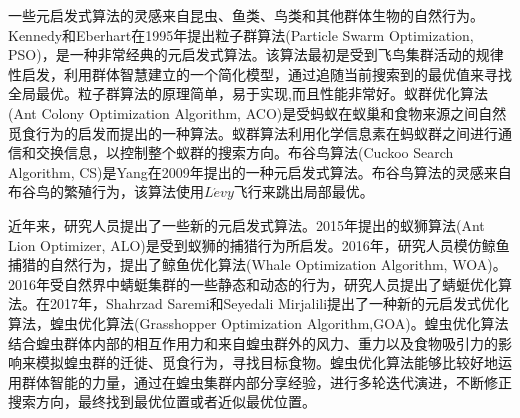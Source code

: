 一些元启发式算法的灵感来自昆虫、鱼类、鸟类和其他群体生物的自然行为。Kennedy和Eberhart在1995年提出粒子群算法(Particle Swarm Optimization, PSO)，是一种非常经典的元启发式算法\cite{kennedy1995particle,liao2007discrete,krishnasamy2013task}。该算法最初是受到飞鸟集群活动的规律性启发，利用群体智慧建立的一个简化模型，通过追随当前搜索到的最优值来寻找全局最优。粒子群算法的原理简单，易于实现,而且性能非常好。蚁群优化算法(Ant Colony Optimization Algorithm, ACO)是受蚂蚁在蚁巢和食物来源之间自然觅食行为的启发而提出的一种算法\cite{dorigo1997ant,dorigo1999ant,郝航2018基于并行化蚁群算法的网络测量节点选取算法}。蚁群算法利用化学信息素在蚂蚁群之间进行通信和交换信息，以控制整个蚁群的搜索方向。布谷鸟算法(Cuckoo Search Algorithm, CS)是Yang在2009年提出的一种元启发式算法\cite{yang2009cuckoo}。布谷鸟算法的灵感来自布谷鸟的繁殖行为，该算法使用$L\acute{e}vy$飞行来跳出局部最优。

近年来，研究人员提出了一些新的元启发式算法。2015年提出的蚁狮算法(Ant Lion Optimizer, ALO)是受到蚁狮的捕猎行为所启发\cite{mirjalili2015ant}。2016年，研究人员模仿鲸鱼捕猎的自然行为，提出了鲸鱼优化算法(Whale Optimization Algorithm, WOA)\cite{mirjalili2016whale,hu2016whale}。2016年受自然界中蜻蜓集群的一些静态和动态的行为，研究人员提出了蜻蜓优化算法\cite{mirjalili2016dragonfly,abdel2017solving,ks2017memory,song2017elite}。在2017年，Shahrzad Saremi和Seyedali Mirjalili提出了一种新的元启发式优化算法，蝗虫优化算法(Grasshopper Optimization Algorithm,GOA)\cite{saremi2017grasshopper}。蝗虫优化算法结合蝗虫群体内部的相互作用力和来自蝗虫群外的风力、重力以及食物吸引力的影响来模拟蝗虫群的迁徙、觅食行为，寻找目标食物。蝗虫优化算法能够比较好地运用群体智能的力量，通过在蝗虫集群内部分享经验，进行多轮迭代演进，不断修正搜索方向，最终找到最优位置或者近似最优位置。


